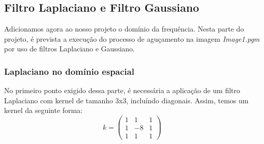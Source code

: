 \documentclass[conference]{IEEEtran}
\begin{document}
\subsection{Filtro Laplaciano e Filtro Gaussiano}
Adicionamos agora ao nosso projeto o domínio da frequência. Nesta parte do projeto, é prevista a execução do processo de aguçamento na imagem \textit{Image1.pgm} por uso de filtros Laplaciano e Gaussiano.
\subsubsection[Laplaciano Espacial]{Laplaciano no domínio espacial}
No primeiro ponto exigido dessa parte, é necessária a aplicação de um filtro Laplaciano com kernel de tamanho 3x3, incluíndo diagonais.
Assim, temos um kernel da seguinte forma:
\begin{equation}
    \label{kernel:middle_8}
    k = \begin{pmatrix}
        1 & 1 & 1\\
        1 & -8 & 1\\
        1 & 1 & 1
    \end{pmatrix}
\end{equation}
\end{document}
